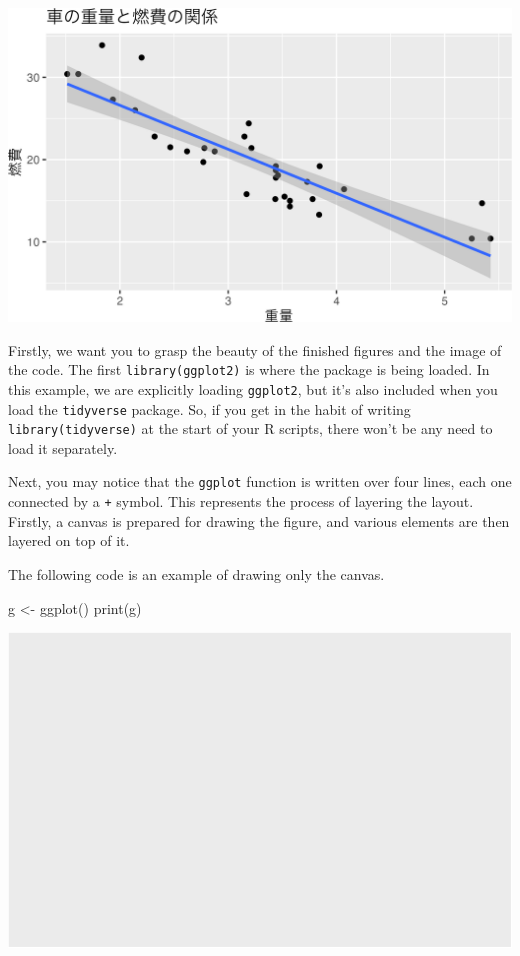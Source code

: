 \documentclass[
  a4paper,
]{book}
\newenvironment{Shaded}{\begin{snugshade}}{\end{snugshade}}
\newcommand{\FunctionTok}[1]{\textcolor[rgb]{0.28,0.35,0.67}{#1}}
\newcommand{\NormalTok}[1]{\textcolor[rgb]{0.00,0.23,0.31}{#1}}
\newcommand{\OtherTok}[1]{\textcolor[rgb]{0.00,0.23,0.31}{#1}}
\begin{document}
\includegraphics{chapter04_files/figure-pdf/ggplotSample1-1.png}

Firstly, we want you to grasp the beauty of the finished figures and the
image of the code. The first \texttt{library(ggplot2)} is where the
package is being loaded. In this example, we are explicitly loading
\texttt{ggplot2}, but it's also included when you load the
\texttt{tidyverse} package. So, if you get in the habit of writing
\texttt{library(tidyverse)} at the start of your R scripts, there won't
be any need to load it separately.

Next, you may notice that the \texttt{ggplot} function is written over
four lines, each one connected by a \texttt{+} symbol. This represents
the process of layering the layout. Firstly, a canvas is prepared for
drawing the figure, and various elements are then layered on top of it.

The following code is an example of drawing only the canvas.

\begin{Shaded}
\begin{Highlighting}[]
\NormalTok{g }\OtherTok{\textless{}{-}} \FunctionTok{ggplot}\NormalTok{()}
\FunctionTok{print}\NormalTok{(g)}
\end{Highlighting}
\end{Shaded}

\includegraphics{chapter04_files/figure-pdf/canvasOnly-1.pdf}
\end{document}

